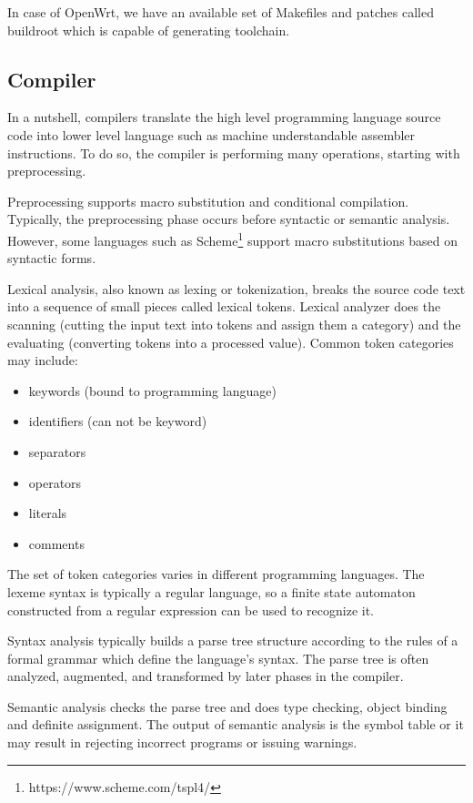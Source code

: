 In case of OpenWrt, we have an available set of Makefiles and patches called buildroot which is capable of generating toolchain.



\subsection{Compiler}

In a nutshell, compilers translate the high level programming language source code into lower level language such as machine understandable assembler instructions.
To do so, the compiler is performing many operations, starting with preprocessing.

Preprocessing supports macro substitution and conditional compilation.
Typically, the preprocessing phase occurs before syntactic or semantic analysis.
However, some languages such as Scheme\footnote{https://www.scheme.com/tspl4/} support macro substitutions based on syntactic forms.

Lexical analysis, also known as lexing or tokenization, breaks the source code text into a sequence of small pieces called lexical tokens.
Lexical analyzer does the scanning (cutting the input text into tokens and assign them a category) and the evaluating (converting tokens into a processed value).
Common token categories may include:
\begin{itemize}
    \item keywords (bound to programming language)
    \item identifiers (can not be keyword)
    \item separators
    \item operators
    \item literals
    \item comments
\end{itemize}
The set of token categories varies in different programming languages.
The lexeme syntax is typically a regular language, so a finite state automaton constructed from a regular expression can be used to recognize it. %

Syntax analysis typically builds a parse tree structure according to the rules of a formal grammar which define the language's syntax.
The parse tree is often analyzed, augmented, and transformed by later phases in the compiler.

Semantic analysis checks the parse tree and does type checking, object binding and definite assignment.
The output of semantic analysis is the symbol table or it may result in rejecting incorrect programs or issuing warnings. %

